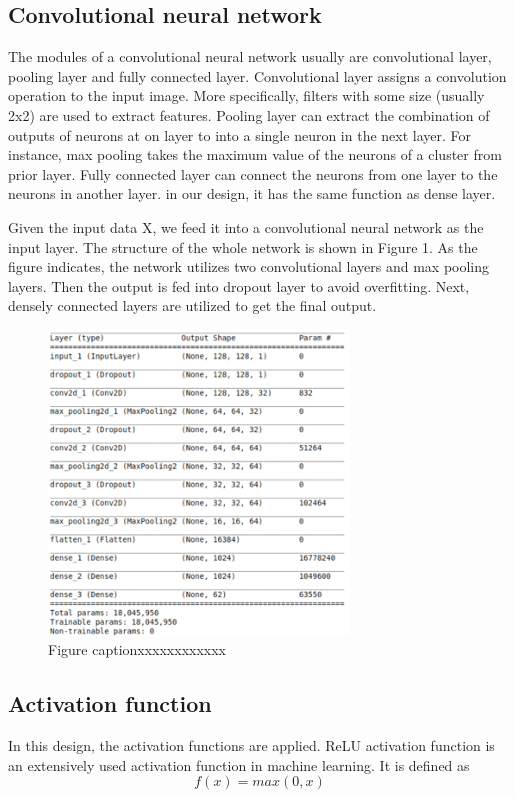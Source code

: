 \documentclass[twoside,twocolumn]{article}
\begin{document}
\subsection{Convolutional neural network}
The modules of a convolutional neural network usually are convolutional layer, pooling layer and fully connected layer. Convolutional layer assigns a convolution operation to the input image. More specifically, filters with some size (usually 2x2) are used to extract features. Pooling layer can extract the combination of outputs of neurons at on layer to into a single neuron in the next layer. For instance, max pooling takes the maximum value of the neurons of a cluster from prior layer. Fully connected layer can connect the neurons from one layer to the neurons in another layer. in our design, it has the same function as dense layer. 

Given the input data X, we feed it into a convolutional neural network as the input layer. The structure of the whole network is shown in Figure 1. As the figure indicates, the network utilizes two convolutional layers and max pooling layers. Then the output is fed into dropout layer to avoid overfitting. Next, densely connected layers are utilized to get the final output.

\begin{figure}[h]
\includegraphics[width=8cm]{results_exp.png}
\centering
\caption{Figure captionxxxxxxxxxxxx}\label{fig3}
\end{figure}


\subsection{Activation function}

In this design, the activation functions are applied. 
ReLU activation function is an extensively used activation function in machine learning. It is defined as 
\begin{equation}
\label{eq:1}
f(x) = max(0,x)
\end{equation}
\end{document}
